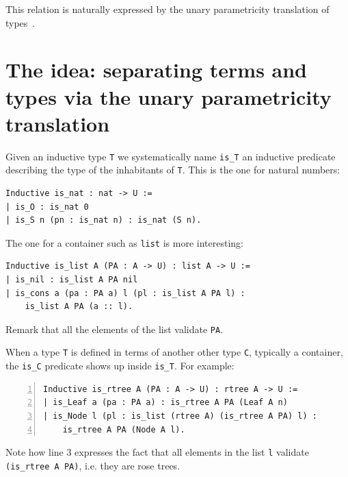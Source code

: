 \documentclass[sigplan,10pt,review]{acmart}\settopmatter{printfolios=true,printccs=false,printacmref=false}
\begin{document}
This relation is naturally expressed by the unary parametricity
translation of types~\cite{Wadler:1989:TF:99370.99404}.

\section{The idea: separating terms and types via the unary parametricity translation}
\label{sec:idea}

Given an inductive type \lstinline+T+ we systematically name \lstinline+is_T+
an inductive predicate describing the type of the inhabitants of
\lstinline+T+. This is the one for natural numbers:

\begin{minipage}{\textwidth}\begin{lstlisting}
Inductive is_nat : nat -> U :=
| is_O : is_nat 0
| is_S n (pn : is_nat n) : is_nat (S n).
\end{lstlisting}\end{minipage}

\noindent
The one for a container such as \lstinline+list+ is more interesting:

\begin{minipage}{\textwidth}\begin{lstlisting}
Inductive is_list A (PA : A -> U) : list A -> U :=
| is_nil : is_list A PA nil
| is_cons a (pa : PA a) l (pl : is_list A PA l) :
    is_list A PA (a :: l).
\end{lstlisting}\end{minipage}

\noindent
Remark that all the elements of the list validate \lstinline+PA+.

When a type \lstinline+T+ is defined in terms of another other type
\lstinline+C+, typically a container, the \lstinline+is_C+ predicate
shows up inside \lstinline+is_T+. For example:

\begin{minipage}{\textwidth}\begin{lstlisting}[numbers=left]
Inductive is_rtree A (PA : A -> U) : rtree A -> U :=
| is_Leaf a (pa : PA a) : is_rtree A PA (Leaf A n)
| is_Node l (pl : is_list (rtree A) (is_rtree A PA) l) :
    is_rtree A PA (Node A l).
\end{lstlisting}\end{minipage}

\noindent
Note how line 3 expresses the fact that all elements in the list
\lstinline+l+ validate \lstinline+(is_rtree A PA)+, i.e. they are
rose trees.
\end{document}
